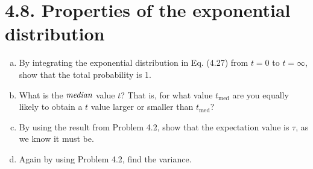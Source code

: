 \section*{4.8. Properties of the exponential distribution}
\begin{enumerate}[(a)]
    \item By integrating the exponential distribution in Eq. (4.27) from
        $t = 0$ to $t = \infty$, show that the total probability is 1. 

    \item What is the $\emph{median}$ value $t$? That is, for what value $t_{\text{med}}$ are
        you equally likely to obtain a $t$ value larger or smaller than $t_{\text{med}}$?

    \item By using the result from Problem 4.2, show that the expectation value is $\tau$, as
        we know it must be.

    \item Again by using Problem 4.2, find the variance.
\end{enumerate}

\pagebreak
\vspace{1em}

